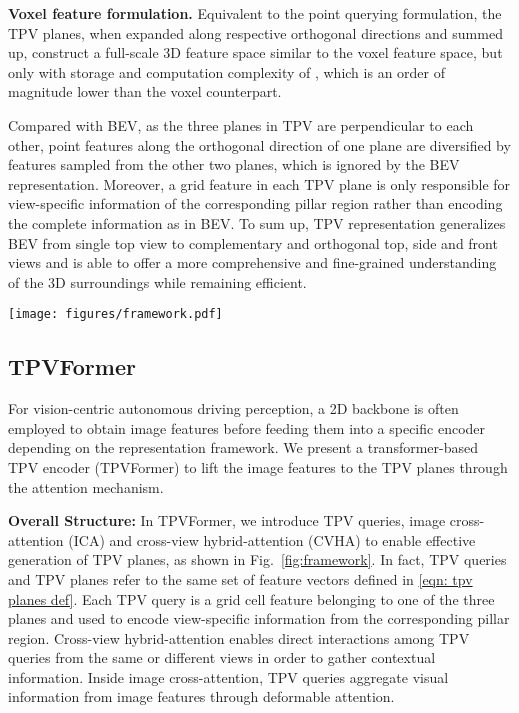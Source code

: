 \documentclass[10pt,twocolumn,letterpaper]{article}
\begin{document}
\textbf{Voxel feature formulation.}
Equivalent to the point querying formulation, the TPV planes, when expanded along respective orthogonal directions and summed up, construct a full-scale 3D feature space similar to the voxel feature space, but only with storage and computation complexity of , which is an order of magnitude lower than the voxel counterpart.

Compared with BEV, as the three planes in TPV are perpendicular to each other, point features along the orthogonal direction of one plane are diversified by features sampled from the other two planes, which is ignored by the BEV representation.
Moreover, a grid feature in each TPV plane is only responsible for view-specific information of the corresponding pillar region rather than encoding the complete information as in BEV.
To sum up, TPV representation generalizes BEV from single top view to complementary and orthogonal top, side and front views and is able to offer a more comprehensive and fine-grained understanding of the 3D surroundings while remaining efficient.


\begin{figure*}[t]
\centering
\texttt{[image: figures/framework.pdf]}
\vspace{-7mm}
\caption{Framework of the proposed TPVFormer for 3D semantic occupancy prediction.
We employ an image backbone network to extract multi-scale features for multi-camera images. 
We then perform cross-attention to adaptively lift 2D features to the TPV space and use cross-view hybrid attention to enable the interactions between TPV planes.
To predict the semantic occupancy of a point in the 3D space, we apply a lightweight prediction head on the sum of projected features on the three TPV planes.
}
\label{fig:framework}
\vspace{-6mm}
\end{figure*}

\subsection{TPVFormer}
For vision-centric autonomous driving perception, a 2D backbone is often employed to obtain image features before feeding them into a specific encoder depending on the representation framework.
We present a transformer-based TPV encoder (TPVFormer) to lift the image features to the TPV planes through the attention mechanism.

\textbf{Overall Structure:}
In TPVFormer, we introduce TPV queries, image cross-attention (ICA) and cross-view hybrid-attention (CVHA) to enable effective generation of TPV planes, as shown in Fig.~\ref{fig:framework}.
In fact, TPV queries and TPV planes refer to the same set of feature vectors defined in \eqref{eqn: tpv planes def}.
Each TPV query  is a grid cell feature belonging to one of the three planes and used to encode view-specific information from the corresponding pillar region.
Cross-view hybrid-attention enables direct interactions among TPV queries from the same or different views in order to gather contextual information.
Inside image cross-attention, TPV queries aggregate visual information from image features through deformable attention.
\end{document}
